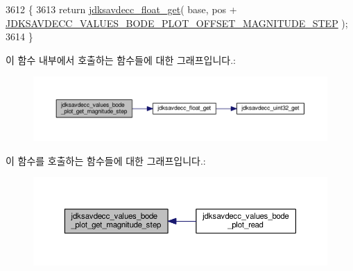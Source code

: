 \begin{DoxyCode}
3612 \{
3613     \textcolor{keywordflow}{return} \hyperlink{group__endian_gadf6108d4d5f2936dd5018e4b80265c8c}{jdksavdecc\_float\_get}( base, pos + 
      \hyperlink{group__values__bode__plot_gad33d13de1d413f49441b1a5eb3270b76}{JDKSAVDECC\_VALUES\_BODE\_PLOT\_OFFSET\_MAGNITUDE\_STEP} );
3614 \}
\end{DoxyCode}


이 함수 내부에서 호출하는 함수들에 대한 그래프입니다.\+:
\nopagebreak
\begin{figure}[H]
\begin{center}
\leavevmode
\includegraphics[width=350pt]{group__values__bode__plot_ga61030f44a4b7b614f42f5faf830eed66_cgraph}
\end{center}
\end{figure}




이 함수를 호출하는 함수들에 대한 그래프입니다.\+:
\nopagebreak
\begin{figure}[H]
\begin{center}
\leavevmode
\includegraphics[width=350pt]{group__values__bode__plot_ga61030f44a4b7b614f42f5faf830eed66_icgraph}
\end{center}
\end{figure}


